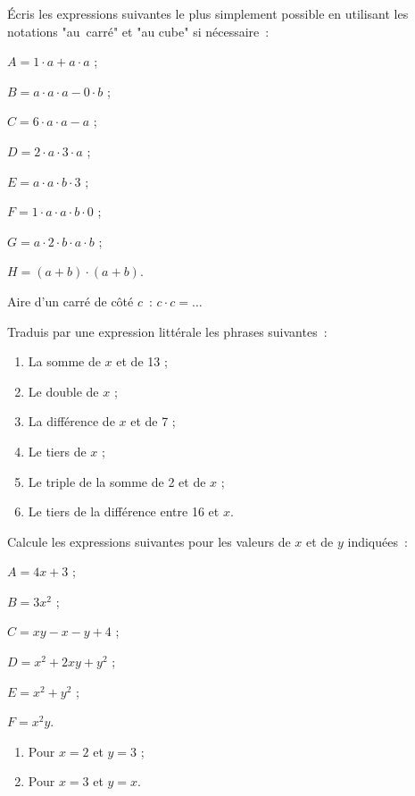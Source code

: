 \begin{exercice}
Écris les expressions suivantes le plus simplement possible en utilisant les notations "au carré" et "au cube" si nécessaire :
\begin{colitemize}{2}
 \item $A = 1 \cdot a + a \cdot a$ ;
 \item $B = a \cdot a \cdot a - 0 \cdot b$ ;
 \item $C = 6 \cdot a \cdot a - a$ ; 
 \item $D = 2 \cdot a \cdot 3 \cdot a$ ; 
 \item $E = a \cdot a \cdot b \cdot 3$ ;
 \item $F = 1 \cdot a \cdot a \cdot b \cdot 0$ ;
 \item $G = a \cdot 2 \cdot b \cdot a \cdot b$ ;
 \item $H = (a + b) \cdot (a + b)$.
 \end{colitemize}
Aire d'un carré de côté $c$ : $c \cdot c = \ldots$
\end{exercice}


\begin{exercice}
Traduis par une expression littérale les phrases suivantes :
\begin{enumerate}
 \item La somme de $x$ et de 13 ;
 \item Le double de $x$ ;
 \item La différence de $x$ et de 7 ;
 \item Le tiers de $x$ ;
 \item Le triple de la somme de 2 et de $x$ ;
 \item Le tiers de la différence entre 16 et $x$.
 \end{enumerate}
\end{exercice}


\begin{exercice}
Calcule les expressions suivantes pour les valeurs de $x$ et de $y$ indiquées :
\begin{colitemize}{2}
 \item $A = 4 x + 3$ ;
 \item $B	= 3 x^2$ ;
 \item $C	= x y - x - y + 4$ ;
 \item $D	= x^2 + 2xy + y^2$ ;
 \item $E	= x^2 + y^2$ ;
 \item $F	= x^2 y$.
 \end{colitemize}
 \begin{enumerate}
  \item Pour $x = 2$ et $y = 3$ ;
  \item Pour $x = 3$ et $y = x$.
  \end{enumerate}
\end{exercice}

